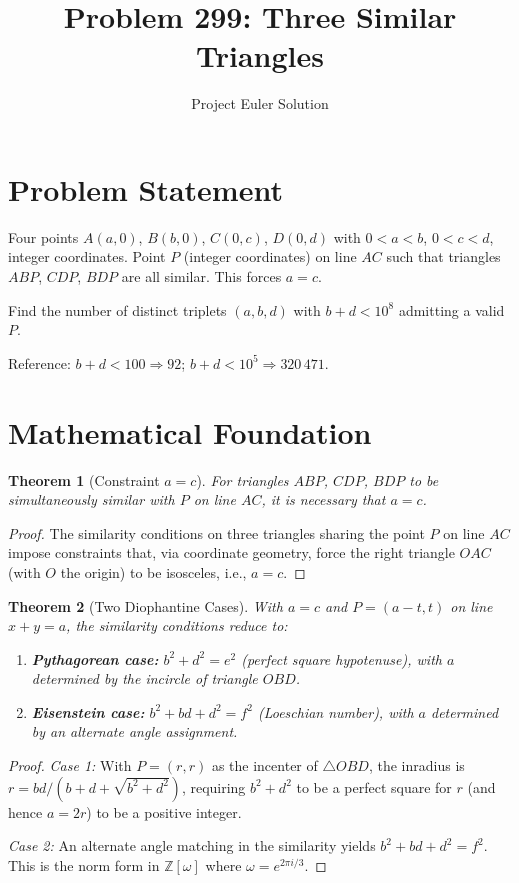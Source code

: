 \documentclass[12pt]{article}
\title{Problem 299: Three Similar Triangles}
\author{Project Euler Solution}
\date{}
\newtheorem{theorem}{Theorem}
\begin{document}
\maketitle

\section{Problem Statement}
Four points $A(a,0)$, $B(b,0)$, $C(0,c)$, $D(0,d)$ with $0 < a < b$, $0 < c < d$, integer coordinates. Point $P$ (integer coordinates) on line $AC$ such that triangles $ABP$, $CDP$, $BDP$ are all similar. This forces $a = c$.

Find the number of distinct triplets $(a,b,d)$ with $b + d < 10^8$ admitting a valid $P$.

Reference: $b+d<100 \Rightarrow 92$; $b+d<10^5 \Rightarrow 320\,471$.

\section{Mathematical Foundation}

\begin{theorem}[Constraint $a = c$]
For triangles $ABP$, $CDP$, $BDP$ to be simultaneously similar with $P$ on line $AC$, it is necessary that $a = c$.
\end{theorem}

\begin{proof}
The similarity conditions on three triangles sharing the point $P$ on line $AC$ impose constraints that, via coordinate geometry, force the right triangle $OAC$ (with $O$ the origin) to be isosceles, i.e., $a = c$.
\end{proof}

\begin{theorem}[Two Diophantine Cases]
With $a = c$ and $P = (a-t, t)$ on line $x + y = a$, the similarity conditions reduce to:
\begin{enumerate}
\item \textbf{Pythagorean case:} $b^2 + d^2 = e^2$ (perfect square hypotenuse), with $a$ determined by the incircle of triangle $OBD$.
\item \textbf{Eisenstein case:} $b^2 + bd + d^2 = f^2$ (Loeschian number), with $a$ determined by an alternate angle assignment.
\end{enumerate}
\end{theorem}

\begin{proof}
\emph{Case 1:} With $P = (r, r)$ as the incenter of $\triangle OBD$, the inradius is $r = bd/(b+d+\sqrt{b^2+d^2})$, requiring $b^2 + d^2$ to be a perfect square for $r$ (and hence $a = 2r$) to be a positive integer.

\emph{Case 2:} An alternate angle matching in the similarity yields $b^2 + bd + d^2 = f^2$. This is the norm form in $\mathbb{Z}[\omega]$ where $\omega = e^{2\pi i/3}$.
\end{proof}
\end{document}
